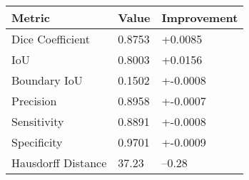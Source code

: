 \begin{tabular}{lll}
\toprule
Metric & Value & Improvement \\
\midrule
Dice Coefficient & 0.8753 & +0.0085 \\
IoU & 0.8003 & +0.0156 \\
Boundary IoU & 0.1502 & +-0.0008 \\
Precision & 0.8958 & +-0.0007 \\
Sensitivity & 0.8891 & +-0.0008 \\
Specificity & 0.9701 & +-0.0009 \\
Hausdorff Distance & 37.23 & --0.28 \\
\bottomrule
\end{tabular}
